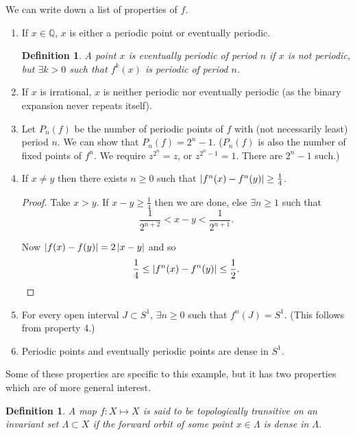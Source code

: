 \documentclass{notes}
\newcommand{\Q}{\mathbb{Q}}
\theoremstyle{plain}
\newtheorem{definition}[proposition]{Definition}
\begin{document}
We can write down a list of properties of $f$.

\begin{enumerate}
\item If $x \in \Q$, $x$ is either a periodic
point or eventually periodic.

\begin{definition}
A point $x$ is eventually periodic of period $n$ if $x$ is not periodic,
but $\exists k > 0$ such that $f^k(x)$ is periodic of period $n$.
\end{definition}

\item If $x$ is irrational, $x$ is neither periodic nor eventually periodic
(as the binary expansion never repeats itself).

\item Let $P_n(f)$ be the number of periodic points of $f$ with
(not necessarily least) period $n$.  We can show that $P_n(f) = 2^n - 1$.
($P_n(f)$ is also the number of fixed points of $f^n$.  We require
$z^{2^n} = z$, or $z^{2^n - 1} = 1$.  There are $2^n-1$ such.)

\item If $x \neq y$ then there exists $n \ge 0$ such that
$\left|f^n(x) - f^n(y)\right| \ge \tfrac{1}{4}$.

\begin{proof}
Take $x > y$.  If $x-y \ge \tfrac{1}{4}$ then we are done, else
$\exists n \ge 1$ such that
\[
\frac{1}{2^{n+2}} < x - y < \frac{1}{2^{n+1}}.
\]

Now $\left|f(x) - f(y)\right| = 2 \left|x-y\right|$ and so
\[
\frac{1}{4} \le \left|f^n(x) - f^n(y)\right| \le \frac{1}{2}.
\]
\end{proof}

\item For every open interval $J \subset S^1$, $\exists n \ge 0$ such that
$f^n(J) = S^1$. (This follows from property 4.)

\item Periodic points and eventually periodic points are dense in $S^1$.
\end{enumerate}

Some of these properties are specific to this example, but it
has two properties which are of more general interest.

\begin{definition}
A map $f \colon X \mapsto X$ is said to be \emph{topologically transitive}
on an invariant set $\Lambda \subset X$ if the forward orbit of some point
$x \in \Lambda$ is dense in $\Lambda$.
\end{definition}
\end{document}
